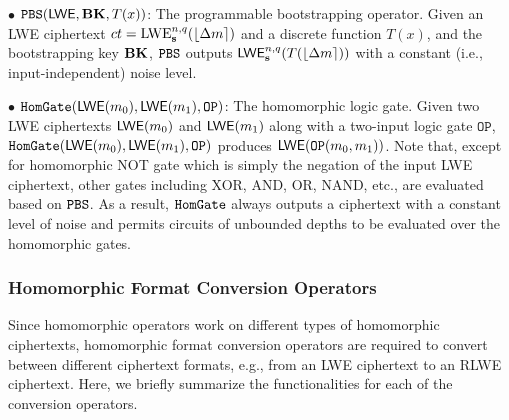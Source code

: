 
$\bullet$ $\texttt{PBS}({\mathsf{LWE}}, {\mathbf{BK}}, T(x))$: The programmable bootstrapping operator.
Given an LWE ciphertext $ct = {\rm LWE}_{\mathbf{s}}^{n,q}(\lfloor \Delta m \rceil)$ 
and a discrete function $T(x)$, and the bootstrapping key ${\mathbf{BK}}$, $\texttt{PBS}$ outputs
${\mathsf{LWE}}_{\mathbf{s}}^{n,q}(T(\lfloor \Delta m \rceil))$ 
with a constant (i.e., input-independent) noise level.

$\bullet$ $\texttt{HomGate}({\mathsf{LWE}}(m_0), {\mathsf{LWE}}(m_1), \texttt{OP})$: The homomorphic logic gate.
Given two LWE ciphertexts ${\mathsf{LWE}}(m_0)$ and ${\mathsf{LWE}}(m_1)$ along with a two-input
logic gate $\texttt{OP}$,
$\texttt{HomGate}({\mathsf{LWE}}(m_0), {\mathsf{LWE}}(m_1), \texttt{OP})$ produces ${\mathsf{LWE}}(\texttt{OP}(m_0, m_1))$.
Note that, except for homomorphic NOT gate which is simply the negation of the input
LWE ciphertext, other gates including XOR, AND, OR, NAND, etc., are evaluated 
based on $\texttt{PBS}$. As a result, $\texttt{HomGate}$ always outputs a ciphertext with
a constant level of noise and permits circuits of unbounded depths to be
evaluated over the homomorphic gates.




\subsubsection{Homomorphic Format Conversion Operators}
Since homomorphic operators work on  different types of homomorphic ciphertexts,
homomorphic format conversion operators are required to convert between
different ciphertext formats, e.g., from an LWE ciphertext to an RLWE ciphertext.
Here, we briefly summarize the functionalities for each of the conversion
operators.

